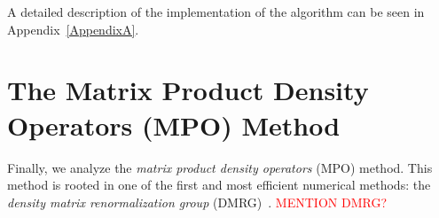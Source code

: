 A detailed description of the implementation of the algorithm can be seen in Appendix~\ref{AppendixA}.


\section{The Matrix Product Density Operators (MPO) Method}
Finally, we analyze the \emph{matrix product density operators} (MPO) method.
This method is rooted in one of the first and most efficient numerical methods: the \emph{density matrix renormalization group} (DMRG)~\cite{s_white:dmrg, PhysRevB.48.10345, RevModPhys.77.259}.
\textcolor{red}{MENTION DMRG?}

